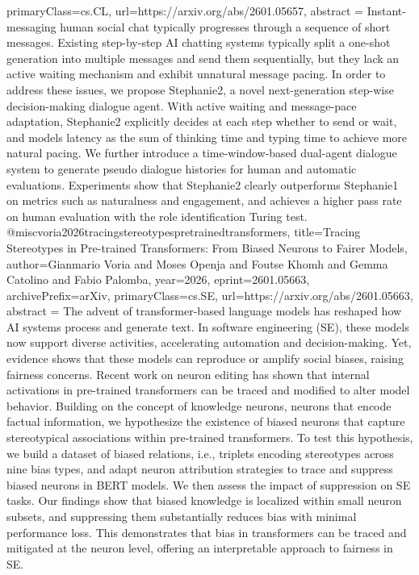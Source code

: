 {      primaryClass={cs.CL},
      url={https://arxiv.org/abs/2601.05657},
      abstract = {Instant-messaging human social chat typically progresses through a sequence of short messages. Existing step-by-step AI chatting systems typically split a one-shot generation into multiple messages and send them sequentially, but they lack an active waiting mechanism and exhibit unnatural message pacing. In order to address these issues, we propose Stephanie2, a novel next-generation step-wise decision-making dialogue agent. With active waiting and message-pace adaptation, Stephanie2 explicitly decides at each step whether to send or wait, and models latency as the sum of thinking time and typing time to achieve more natural pacing. We further introduce a time-window-based dual-agent dialogue system to generate pseudo dialogue histories for human and automatic evaluations. Experiments show that Stephanie2 clearly outperforms Stephanie1 on metrics such as naturalness and engagement, and achieves a higher pass rate on human evaluation with the role identification Turing test.}
}@misc{voria2026tracingstereotypespretrainedtransformers,
      title={Tracing Stereotypes in Pre-trained Transformers: From Biased Neurons to Fairer Models}, 
      author={Gianmario Voria and Moses Openja and Foutse Khomh and Gemma Catolino and Fabio Palomba},
      year={2026},
      eprint={2601.05663},
      archivePrefix={arXiv},
      primaryClass={cs.SE},
      url={https://arxiv.org/abs/2601.05663},
      abstract = {The advent of transformer-based language models has reshaped how AI systems process and generate text. In software engineering (SE), these models now support diverse activities, accelerating automation and decision-making. Yet, evidence shows that these models can reproduce or amplify social biases, raising fairness concerns. Recent work on neuron editing has shown that internal activations in pre-trained transformers can be traced and modified to alter model behavior. Building on the concept of knowledge neurons, neurons that encode factual information, we hypothesize the existence of biased neurons that capture stereotypical associations within pre-trained transformers. To test this hypothesis, we build a dataset of biased relations, i.e., triplets encoding stereotypes across nine bias types, and adapt neuron attribution strategies to trace and suppress biased neurons in BERT models. We then assess the impact of suppression on SE tasks. Our findings show that biased knowledge is localized within small neuron subsets, and suppressing them substantially reduces bias with minimal performance loss. This demonstrates that bias in transformers can be traced and mitigated at the neuron level, offering an interpretable approach to fairness in SE.}
}
